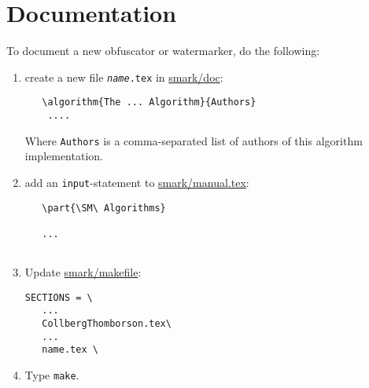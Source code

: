 \section{Documentation}
To document a new obfuscator or watermarker, do the following:
\begin{enumerate}
    \item create a new file {\tt {\em name}.tex} in \url{smark/doc}:
\begin{verbatim}
   \algorithm{The ... Algorithm}{Authors}
    ....
\end{verbatim}
    Where {\tt Authors} is a comma-separated list of authors
    of this algorithm implementation.
    \item add an {\tt input}-statement to \url{smark/manual.tex}:
\begin{verbatim}
   \part{\SM\ Algorithms}
   
   ...
   
\end{verbatim}
   \item Update \url{smark/makefile}:
\begin{verbatim}
SECTIONS = \
   ...
   CollbergThomborson.tex\
   ...
   name.tex \
\end{verbatim}
   \item Type {\tt make}.
\end{enumerate}
